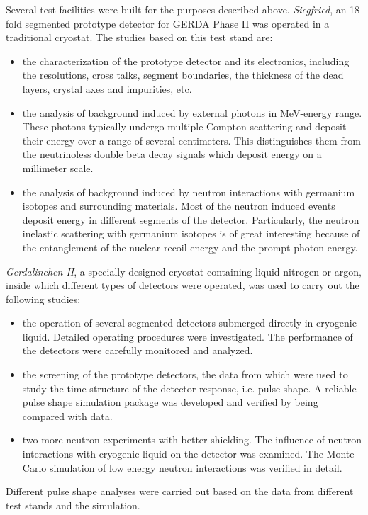 Several test facilities were built for the purposes described above.
\emph{Siegfried}, an 18-fold segmented prototype detector for GERDA
Phase II was operated in a traditional cryostat. The studies based on
this test stand are:
\begin{itemize}
\item the characterization of the prototype detector and its
  electronics, including the resolutions, cross talks, segment
  boundaries, the thickness of the dead layers, crystal axes and
  impurities, etc.
\item the analysis of background induced by external photons in
  MeV-energy range. These photons typically undergo multiple Compton
  scattering and deposit their energy over a range of several
  centimeters. This distinguishes them from the neutrinoless double
  beta decay signals which deposit energy on a millimeter scale.
\item the analysis of background induced by neutron interactions with
  germanium isotopes and surrounding materials. Most of the neutron
  induced events deposit energy in different segments of the detector.
  Particularly, the neutron inelastic scattering with germanium
  isotopes is of great interesting because of the entanglement of the
  nuclear recoil energy and the prompt photon energy.
\end{itemize}
\emph{Gerdalinchen II}, a specially designed cryostat containing
liquid nitrogen or argon, inside which different types of detectors
were operated, was used to carry out the following studies:
\begin{itemize}
\item the operation of several segmented detectors submerged directly
  in cryogenic liquid. Detailed operating procedures were
  investigated. The performance of the detectors were carefully
  monitored and analyzed.
\item the screening of the prototype detectors, the data from which
  were used to study the time structure of the detector response, i.e.
  pulse shape. A reliable pulse shape simulation package was developed
  and verified by being compared with data.
\item two more neutron experiments with better shielding. The
  influence of neutron interactions with cryogenic liquid on the
  detector was examined. The Monte Carlo simulation of low energy
  neutron interactions was verified in detail.
\end{itemize}
Different pulse shape analyses were carried out based on the data from
different test stands and the simulation.

